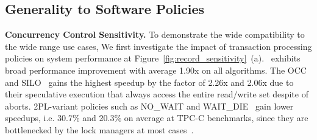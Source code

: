 


\subsection{Generality to Software Policies}    \label{subsec:generality}

\noindent \textbf{Concurrency Control Sensitivity. } 
To demonstrate the wide compatibility to the wide range use cases, 
We first investigate the impact of transaction processing policies on system performance at Figure~\ref{fig:record_sensitivity}~(a). 
\name~exhibits broad performance improvement with average 1.90x on all algorithms. The OCC~\cite{occ_tbs81} and SILO~\cite{silo_sosp13} gains the highest speedup by the factor of 2.26x and 2.06x due to their speculative execution that always access the entire read/write set despite of aborts. 2PL-variant policies such as NO\_WAIT and WAIT\_DIE~\cite{2pl} gain lower speedups, i.e. 30.7\% and 20.3\% on average at TPC-C benchmarks, since they are bottlenecked by the lock managers at most cases~\cite{abyss_vldb14}.


